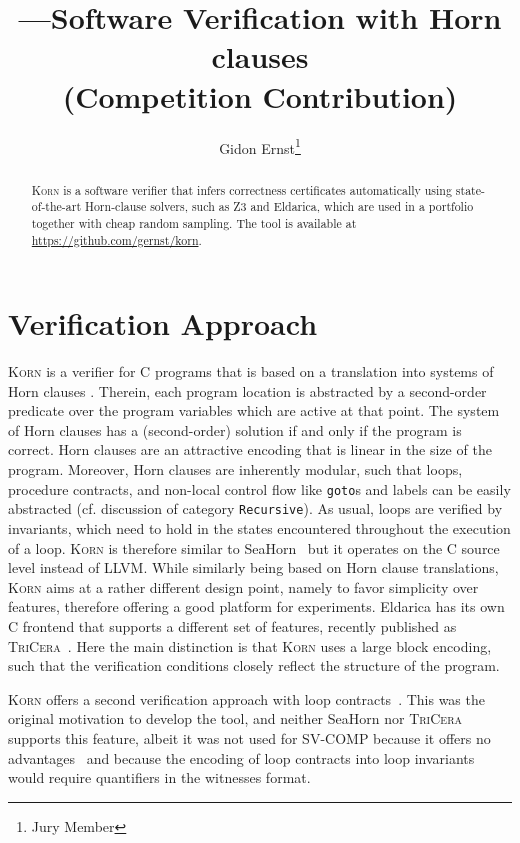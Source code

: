 \documentclass{llncs}
\author{Gidon Ernst\thanks{Jury Member}}
\title{\Korn---Software Verification with Horn clauses \\ (Competition Contribution)}
\institute{LMU Munich \\ \mailto{gidon.ernst@lmu.de}}
\newcommand{\Korn}{\textsc{Korn}\xspace}
\begin{document}
\maketitle

\begin{abstract}
    \Korn is a software verifier that infers correctness certificates automatically using state-of-the-art Horn-clause solvers, such as Z3 and Eldarica,
    which are used in a portfolio together with cheap random sampling.
    The tool is available at \url{https://github.com/gernst/korn}.

\end{abstract}

\section{Verification Approach}
\label{sec:approach}

\Korn is a verifier for C programs that is based on a translation into systems of Horn clauses
\cite{bjorner2015horn,gurfinkel2019science}.
Therein, each program location is abstracted by a second-order predicate
over the program variables which are active at that point.
The system of Horn clauses has a (second-order) solution if and only if the program is correct.
Horn clauses are an attractive encoding that is linear in the size of the program.
Moreover, Horn clauses are inherently modular,
such that loops, procedure contracts, and non-local control flow like \texttt{goto}s and labels can be easily abstracted (cf. discussion of category \texttt{Recursive}).
As usual, loops are verified by invariants, which need to hold in the states
encountered throughout the execution of a loop.
\Korn is therefore similar to SeaHorn~\cite{gurfinkel2015seahorn} but it operates on the C source level instead of LLVM.
While similarly being based on Horn clause translations,
\Korn aims at a rather different design point, namely to favor simplicity over features, therefore offering a good platform for experiments.
Eldarica has its own C frontend that supports a different set of features,
recently published as \textsc{TriCera}~\cite{esen2022tricera}.
Here the main distinction is that \Korn uses a large block encoding,
such that the verification conditions closely reflect the structure of the program.

\Korn offers a second verification approach with loop contracts~\cite{hehner1999refinement,tuerk2010local,hehner2005specified,ernst:vmcai2022}.
This was the original motivation to develop the tool, and neither
SeaHorn nor \textsc{TriCera} supports this feature,
albeit it was not used for SV-COMP because
it offers no advantages~\cite{ernst:arxiv2020:summaries}
and because the encoding of loop contracts into loop invariants would require quantifiers in the witnesses format.
\end{document}
